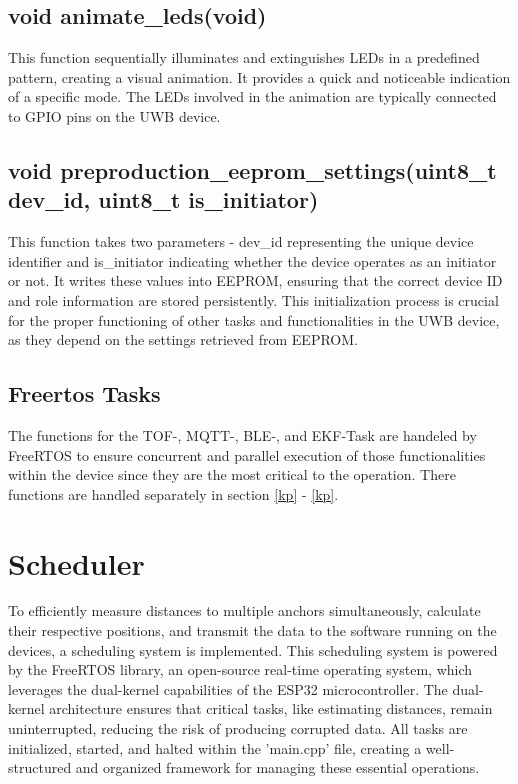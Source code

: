 \subsection{void animate\_leds(void)}
\label{subsec:animate_leds}
This function sequentially illuminates and extinguishes LEDs in a predefined pattern, creating a visual animation. 
It provides a quick and noticeable indication of a specific mode. 
The LEDs involved in the animation are typically connected to GPIO pins on the UWB device. 

\subsection{void preproduction\_eeprom\_settings(uint8\_t dev\_id, uint8\_t is\_initiator)}
\label{subsec:preproduction_eeprom_settings}
This function takes two parameters - dev\_id representing the unique device identifier and is\_initiator indicating whether the device operates as an initiator or not. 
It writes these values into EEPROM, ensuring that the correct device ID and role information are stored persistently. This initialization process is crucial for the proper functioning of other tasks and functionalities in the UWB device, as they depend on the settings retrieved from EEPROM.

\subsection{Freertos Tasks}
\label{subsec:Freertos_Tasks}
The functions for the TOF-, MQTT-, BLE-, and EKF-Task are handeled by FreeRTOS to ensure concurrent and parallel execution of those functionalities within the device since they are the most critical to the operation. 
There functions are handled separately in section \ref{kp} - \ref{kp}. 

\section{Scheduler}
\label{sec:Scheduler}
To efficiently measure distances to multiple anchors simultaneously, calculate their respective positions, and transmit the data to the software running on the devices, a scheduling system is implemented. 
This scheduling system is powered by the FreeRTOS library, an open-source real-time operating system, which leverages the dual-kernel capabilities of the ESP32 microcontroller.
\vspace{4pt}
\newline
The dual-kernel architecture ensures that critical tasks, like estimating distances, remain uninterrupted, reducing the risk of producing corrupted data. 
All tasks are initialized, started, and halted within the 'main.cpp' file, creating a well-structured and organized framework for managing these essential operations.

